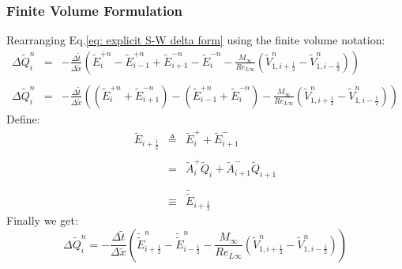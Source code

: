 \documentclass[11pt, a4paper]{article}
\begin{document}
\subsubsection{Finite Volume Formulation}
Rearranging Eq.\ref{eq: explicit S-W delta form} using the finite volume notation:
\begin{equation}
    \begin{array}{lcl}
        \Delta\tilde{Q}_i^n & = & \displaystyle-\frac{\Delta\tilde{t}}{\Delta\tilde{x}}\left(\tilde{E}_i^{+n}-\tilde{E}_{i-1}^{+n}+\tilde{E}_{i+1}^{-n}-\tilde{E}_i^{-n}-\frac{M_\infty}{Re_{L\infty}}\left(\tilde{V}_{1,i+\frac{1}{2}}^{n}-\tilde{V}_{1,i-\frac{1}{2}}^{n}\right)\right) \\\\
        \Delta\tilde{Q}_i^n & = & \displaystyle-\frac{\Delta\tilde{t}}{\Delta\tilde{x}}\left(\left(\tilde{E}_i^{+n}+\tilde{E}_{i+1}^{-n}\right)-\left(\tilde{E}_{i-1}^{+n}+\tilde{E}_i^{-n}\right)-\frac{M_\infty}{Re_{L\infty}}\left(\tilde{V}_{1,i+\frac{1}{2}}^{n}-\tilde{V}_{1,i-\frac{1}{2}}^{n}\right)\right)
    \end{array}
\end{equation}
Define:
\begin{equation}
    \begin{array}{lcl}
        \tilde{E}_{i+\frac{1}{2}} & \triangleq & \tilde{E}_i^++\tilde{E}_{i+1}^- \\\\
        & = & \tilde{A}^+_i\tilde{Q}_i+\tilde{A}^-_{i+1}\tilde{Q}_{i+1} \\\\
        & \equiv & \tilde{\tilde{E}}_{i+\frac{1}{2}}
    \end{array}
\end{equation}
Finally we get:
\begin{equation}
    \Delta\tilde{Q}_i^n=-\frac{\Delta\tilde{t}}{\Delta\tilde{x}}\left(\tilde{\tilde{E}}_{i+\frac{1}{2}}^n-\tilde{\tilde{E}}_{i-\frac{1}{2}}^n-\frac{M_\infty}{Re_{L\infty}}\left(\tilde{V}_{1,i+\frac{1}{2}}^{n}-\tilde{V}_{1,i-\frac{1}{2}}^{n}\right)\right)
    \label{eq: finall explicit S-W}
\end{equation}
\end{document}

